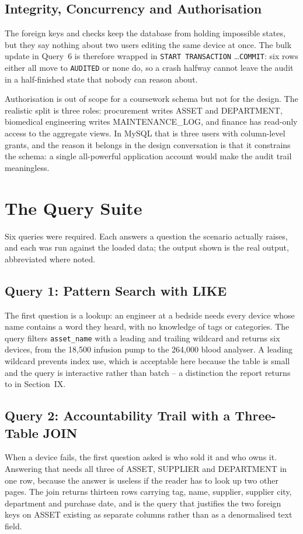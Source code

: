 \documentclass[conference,9pt]{IEEEtran}
\begin{document}
\subsection{Integrity, Concurrency and Authorisation}
The foreign keys and checks keep the database from holding impossible states,
but they say nothing about two users editing the same device at once. The
bulk update in Query~6 is therefore wrapped in \texttt{START TRANSACTION}
\ldots \texttt{COMMIT}: six rows either all move to \texttt{AUDITED} or none
do, so a crash halfway cannot leave the audit in a half-finished state that
nobody can reason about.

Authorisation is out of scope for a coursework schema but not for the design.
The realistic split is three roles: procurement writes ASSET and DEPARTMENT,
biomedical engineering writes MAINTENANCE\_LOG, and finance has read-only
access to the aggregate views. In MySQL that is three users with column-level
grants, and the reason it belongs in the design conversation is that it
constrains the schema: a single all-powerful application account would make
the audit trail meaningless.

\section{The Query Suite}
Six queries were required. Each answers a question the scenario actually
raises, and each was run against the loaded data; the output shown is the real
output, abbreviated where noted.

\subsection{Query 1: Pattern Search with LIKE}
The first question is a lookup: an engineer at a bedside needs every device
whose name contains a word they heard, with no knowledge of tags or
categories. The query filters \texttt{asset\_name} with a leading and trailing
wildcard and returns six devices, from the 18,500 infusion pump to the 264,000
blood analyser. A leading wildcard prevents index use, which is acceptable
here because the table is small and the query is interactive rather than
batch -- a distinction the report returns to in Section~IX.

\subsection{Query 2: Accountability Trail with a Three-Table JOIN}
When a device fails, the first question asked is who sold it and who owns it.
Answering that needs all three of ASSET, SUPPLIER and DEPARTMENT in one row,
because the answer is useless if the reader has to look up two other pages.
The join returns thirteen rows carrying tag, name, supplier, supplier city,
department and purchase date, and is the query that justifies the two foreign
keys on ASSET existing as separate columns rather than as a denormalised text
field.
\end{document}
